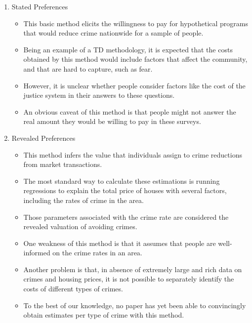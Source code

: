 \documentclass[static]{JJH-Beamer}
\begin{document}
\begin{frame}
 \addtocounter{framenumber}{-1}

\begin{enumerate}
\item Stated Preferences
    \begin{itemize}
    \item This basic method elicits the willingness to pay for hypothetical programs that would reduce crime nationwide for a sample of people.
    \item Being an example of a TD methodology, it is expected that the costs obtained by this method would include factors that affect the community, and that are hard to capture, such as fear.
    \item However, it is unclear whether people consider factors like the cost of the justice system in their answers to these questions.
    \item An obvious caveat of this method is that people might not answer the real amount they would be willing to pay in these surveys.
    \end{itemize}
\end{enumerate}

\end{frame}

\begin{frame}
 \addtocounter{framenumber}{-1}

\begin{enumerate}
\setcounter{enumi}{1}
\item Revealed Preferences
    \begin{itemize}
    \item This method infers the value that individuals assign to crime reductions from market transactions.
    \item The most standard way to calculate these estimations is running regressions to explain the total price of houses with several factors, including the rates of crime in the area.
    \item Those parameters associated with the crime rate are considered the revealed valuation of avoiding crimes.
    \item One weakness of this method is that it assumes that people are well-informed on the crime rates in an area.
    \item Another problem is that, in absence of extremely large and rich data on crimes and housing prices, it is not possible to separately identify the costs of different types of crimes.
    \item To the best of our knowledge, no paper has yet been able to convincingly obtain estimates per type of crime with this method.
    \end{itemize}
\end{enumerate}

\end{frame}
\end{document}
